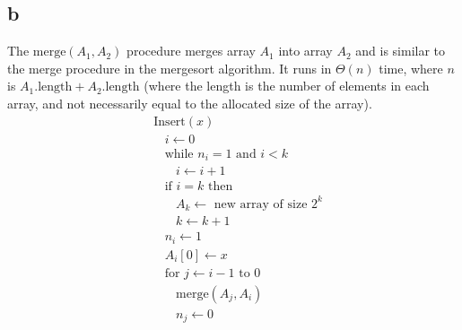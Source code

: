 \documentclass[koma,a4paper]{article}
\begin{document}
\subsection{b}
The $\text{merge}(A_1, A_2)$ procedure merges array $A_1$ into array $A_2$ and is similar to the merge procedure in the mergesort algorithm. It runs in $\Theta(n)$ time, where $n$ is $A_1.\text{length} + A_2.\text{length}$ (where the length is the number of elements in each array, and not necessarily equal to the allocated size of the array).
\begin{align*}
  &\text{Insert}(x)\\
  &~~~~i \leftarrow 0\\
  &~~~~\text{while } n_i = 1 \text{ and } i < k\\
  &~~~~~~~~i \leftarrow i + 1\\
  &~~~~\text{if } i = k \text{ then}\\
  &~~~~~~~~A_k \leftarrow \text{ new array of size } 2^k\\
  &~~~~~~~~k \leftarrow k + 1\\
  &~~~~n_i \leftarrow 1\\
  &~~~~A_i[0] \leftarrow x\\
  &~~~~\text{for } j \leftarrow i - 1 \text{ to } 0\\
  &~~~~~~~~\text{merge}(A_j, A_i)\\
  &~~~~~~~~n_j \leftarrow 0\\
\end{align*}
\end{document}
